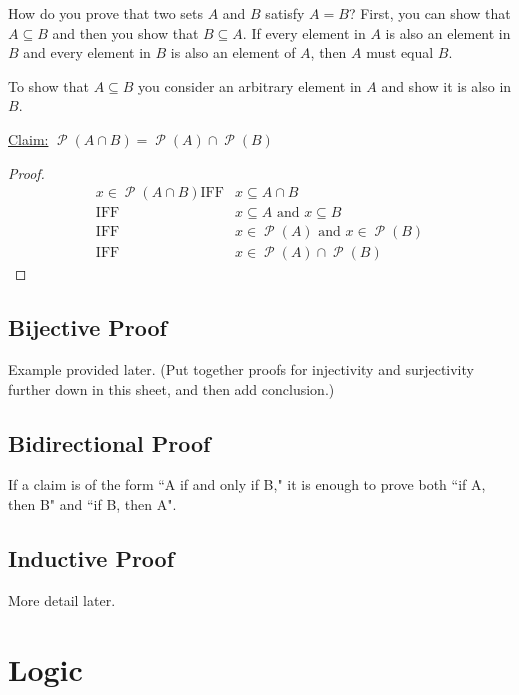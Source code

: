 \documentclass[12pt,letterpaper]{article}
\newcommand{\claim}{\underline{Claim:} }
\newcommand\Pow{\ensuremath{\operatorname{\mathcal{P}}}}
\begin{document}
	How do you prove that two sets $A$ and $B$ satisfy $A = B$? First, you can show that $A \subseteq B$ and then you show that $B \subseteq A$. If every element in $A$ is also an element in $B$ and every element in $B$ is also an element of $A$, then $A$ must equal $B$. 

	To show that $A \subseteq B$ you consider an arbitrary element in $A$ and show it is also in $B$. 

\renewcommand{\iff}{\textrm{IFF}}

		\begin{mdframed}
		\claim $\Pow{(A\cap B)} = \Pow{(A)}\cap \Pow{(B)}$
		\begin{proof}
		\begin{align*}
		x \in \Pow{(A\cap B)}
		\iff & x \subseteq A \cap B \\
		\iff & x \subseteq A \text{ and } x \subseteq B \\
		\iff & x \in \Pow{(A)} \text{ and } x \in \Pow{(B)} \\
		\iff & x \in \Pow{(A)}\cap \Pow{(B)}
		\end{align*}
		\end{proof}		
		\end{mdframed}
    
    \subsection{Bijective Proof}
    
    Example provided later. (Put together proofs for injectivity and surjectivity further down in this sheet, and then add conclusion.)
    
    \subsection{Bidirectional Proof}
    
    If a claim is of the form ``A if and only if B," it is enough to prove both ``if A, then B" and ``if B, then A".
    
    \subsection{Inductive Proof}
    
    More detail later.


\section{Logic}
\end{document}
